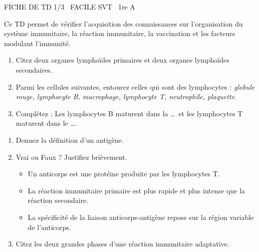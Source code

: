 \documentclass[11pt]{article}
\begin{document}
\begin{tcolorbox}[enhanced,colback=popink,colframe=popink,arc=10pt,boxrule=0pt,left=12pt,right=12pt,top=9pt,bottom=9pt]
{\color{white}\popxbold\small FICHE DE TD 1/3 \textbullet\ FACILE \hfill SVT \textbullet\ 1re A\par}
\end{tcolorbox}
\vspace{4pt}
Ce TD permet de vérifier l'acquisition des connaissances sur l'organisation du système immunitaire, la réaction immunitaire, la vaccination et les facteurs modulant l'immunité.

\begin{exercice}
\begin{enumerate}
    \item Citez deux organes lymphoïdes primaires et deux organes lymphoïdes secondaires.
    \item Parmi les cellules suivantes, entourez celles qui sont des lymphocytes : \textit{globule rouge, lymphocyte B, macrophage, lymphocyte T, neutrophile, plaquette}.
    \item Complétez : Les lymphocytes B maturent dans la \ldots\ et les lymphocytes T maturent dans le \ldots.
\end{enumerate}
\end{exercice}

\begin{exercice}
\begin{enumerate}
    \item Donnez la définition d'un antigène.
    \item Vrai ou Faux ? Justifiez brièvement.
    \begin{itemize}
        \item Un anticorps est une protéine produite par les lymphocytes T.
        \item La réaction immunitaire primaire est plus rapide et plus intense que la réaction secondaire.
        \item La spécificité de la liaison anticorps-antigène repose sur la région variable de l'anticorps.
    \end{itemize}
    \item Citez les deux grandes phases d'une réaction immunitaire adaptative.
\end{enumerate}
\end{exercice}
\end{document}
